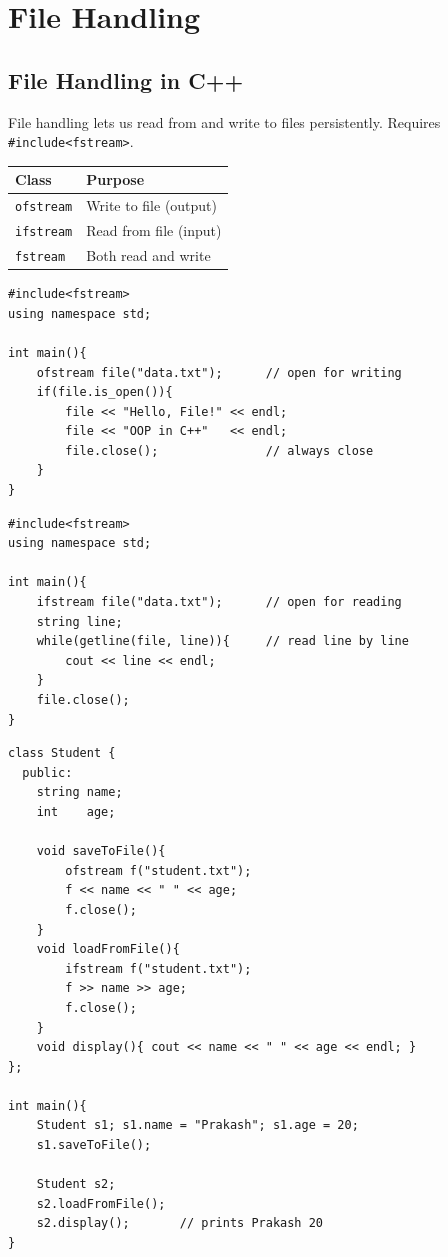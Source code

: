 \documentclass[12pt,a4paper]{report}
\begin{document}
\chapter{File Handling}

\section{File Handling in C++}

File handling lets us read from and write to files persistently.
Requires \texttt{\#include<fstream>}.

\begin{center}
\begin{tabular}{|l|l|}
\hline
\textbf{Class}    & \textbf{Purpose} \\
\hline
\texttt{ofstream} & Write to file (output) \\
\texttt{ifstream} & Read from file (input) \\
\texttt{fstream}  & Both read and write \\
\hline
\end{tabular}
\end{center}

\begin{lstlisting}[caption={Write to a file}]
#include<fstream>
using namespace std;

int main(){
    ofstream file("data.txt");      // open for writing
    if(file.is_open()){
        file << "Hello, File!" << endl;
        file << "OOP in C++"   << endl;
        file.close();               // always close
    }
}
\end{lstlisting}

\begin{lstlisting}[caption={Read from a file}]
#include<fstream>
using namespace std;

int main(){
    ifstream file("data.txt");      // open for reading
    string line;
    while(getline(file, line)){     // read line by line
        cout << line << endl;
    }
    file.close();
}
\end{lstlisting}

\begin{lstlisting}[caption={File Handling with OOP}]
class Student {
  public:
    string name;
    int    age;

    void saveToFile(){
        ofstream f("student.txt");
        f << name << " " << age;
        f.close();
    }
    void loadFromFile(){
        ifstream f("student.txt");
        f >> name >> age;
        f.close();
    }
    void display(){ cout << name << " " << age << endl; }
};

int main(){
    Student s1; s1.name = "Prakash"; s1.age = 20;
    s1.saveToFile();

    Student s2;
    s2.loadFromFile();
    s2.display();       // prints Prakash 20
}
\end{lstlisting}
\end{document}
